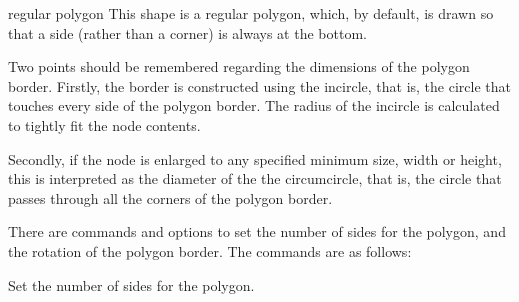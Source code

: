 \begin{shape}{regular polygon}
  This shape is a regular polygon, which, by default, is drawn so that a side
  (rather than a corner) is always at the bottom. 
  
\begin{codeexample}[]
\end{codeexample}

  Two points should be remembered regarding the dimensions of the
  polygon border. Firstly, the border is constructed using the incircle, that is, the
  circle that touches every side of the polygon border. The radius of
  the incircle is calculated to tightly fit the node contents.

\begin{codeexample}[]
\end{codeexample}	
	
  Secondly, if the node is enlarged to any specified minimum size, 
  width or height, this is interpreted as the diameter of the the 
  circumcircle, that is, the circle that passes through all the 
  corners of the polygon border.

\begin{codeexample}[]
\end{codeexample}	

  There are \pgfname{} commands and \tikzname{} options to set the 
  number of sides for the polygon, and the rotation of the polygon 
  border. The \pgfname{} commands are as follows:
	
  \begin{command}{\pgfsetpolygonsides{}}
    Set the number of sides for the polygon.
  \end{command}
  

\end{shape}
